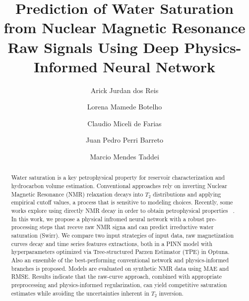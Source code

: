\documentclass[runningheads]{llncs}
\begin{document}
%
\title{Prediction of Water Saturation from Nuclear Magnetic Resonance Raw Signals Using Deep Physics-Informed Neural Network}


\author{
Arick Jurdan dos Reis \and
Lorena Mamede Botelho \and
Claudio Miceli de Farias \and
Juan Pedro Perri Barreto \and
Marcio Mendes Taddei
}





\maketitle
%
\begin{abstract}
Water saturation is a key petrophysical property for reservoir characterization and hydrocarbon volume estimation.
Conventional approaches rely on inverting Nuclear Magnetic Resonance (NMR) relaxation decays into $T_2$ distributions
and applying empirical cutoff values, a process that is sensitive to modeling choices. Recently, some works explore using directly NMR decay in order to obtain petrophysical properties ~\cite{ref_fraga2025,ref_liu_j2022}. In this work, we propose a physical infromed neural network with a robust pre-processing steps that receve raw NMR signa and can predict irreductive water saturation (Swirr). We compare two input strategies of input data, raw magnetization curves decay and time series features extractions, both in a PINN model with hyperparameters optimized via Tree-structured Parzen Estimator (TPE) in Optuna.
Also an ensemble of the best-performing conventional network and physics-informed branches is proposed.
Models are evaluated on synthetic NMR data using MAE and RMSE.
Results indicate that the raw-curve approach, combined with appropriate preprocessing and
physics-informed regularization, can yield competitive saturation estimates while avoiding the uncertainties inherent in $T_2$ inversion.

\end{abstract}
\end{document}
